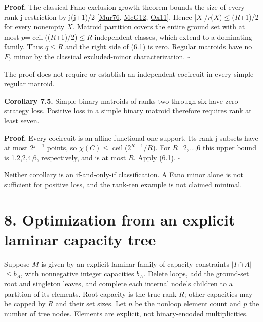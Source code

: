\documentclass[11pt]{article}
\begin{document}
\textbf{Proof.} The classical Fano-exclusion growth theorem bounds the size of every rank-j restriction by j(j+1)/2 [\hyperlink{refMur76}{Mur76}, \hyperlink{refMcG12}{McG12}, \hyperlink{refOx11}{Ox11}]. Hence |\(X\)|/\(r\)(\(X\))\(\le\)(\(R\)+1)/2 for every nonempty \(X\). Matroid partition covers the entire ground set with at most \(p\)=\(\operatorname{ceil}\)((\(R\)+1)/2)\(\le\)\(R\) independent classes, which extend to a dominating family. Thus \(q\le R\) and the right side of (6.1) is zero. Regular matroids have no \(F_7\) minor by the classical excluded-minor characterization. \hfill\ensuremath{\square}

The proof does not require or establish an independent cocircuit in every simple regular matroid.

\textbf{Corollary 7.5.} Simple binary matroids of ranks two through six have zero strategy loss. Positive loss in a simple binary matroid therefore requires rank at least seven.

\textbf{Proof.} Every cocircuit is an affine functional-one support. Its rank-j subsets have at most \(2^{j-1}\) points, so \(\chi(C)\)\(\le\)\(\operatorname{ceil}\)(\(2^{R-1}\)/\(R\)). For \(R\)=2,...,6 this upper bound is 1,2,2,4,6, respectively, and is at most \(R\). Apply (6.1). \hfill\ensuremath{\square}

Neither corollary is an if-and-only-if classification. A Fano minor alone is not sufficient for positive loss, and the rank-ten example is not claimed minimal.

\section*{8. Optimization from an explicit laminar capacity tree}

Suppose \(M\) is given by an explicit laminar family of capacity constraints \(|I\cap A|\)\(\le\)\(b_A\), with nonnegative integer capacities \(b_A\). Delete loops, add the ground-set root and singleton leaves, and complete each internal node's children to a partition of its elements. Root capacity is the true rank \(R\); other capacities may be capped by \(R\) and their set sizes. Let \(n\) be the nonloop element count and \(p\) the number of tree nodes. Elements are explicit, not binary-encoded multiplicities.
\end{document}
